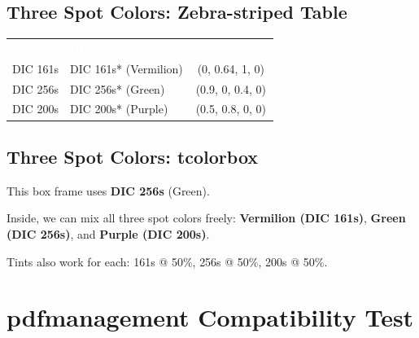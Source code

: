 \documentclass{article}\listfiles\pagestyle{empty}
\newcommand\onelineskip{\par\vspace{\baselineskip}\par}
\begin{document}
\onelineskip

\subsection*{Three Spot Colors: Zebra-striped Table}

\begin{center}
  \renewcommand{\arraystretch}{1.5}
  \begin{tabular}{p{3cm} p{5cm} c}
    \rowcolor{DIC200s}
    \textcolor{white}{\textbf{Color}} & \textcolor{white}{\textbf{PDF Name}} & \textcolor{white}{\textbf{Base CMYK}} \\
    \textcolor{DIC161s}{DIC 161s}  & DIC 161s* (Vermilion) & (0, 0.64, 1, 0) \\
    \textcolor{DIC256s}{DIC 256s}  & DIC 256s* (Green)     & (0.9, 0, 0.4, 0) \\
    \textcolor{DIC200s}{DIC 200s}  & DIC 200s* (Purple)    & (0.5, 0.8, 0, 0) \\
  \end{tabular}
\end{center}

\onelineskip

\subsection*{Three Spot Colors: tcolorbox}

\begin{tcolorbox}[
  enhanced,
  colframe=DIC256s,
  colback=DIC256s!5,
  coltitle=white,
  colbacktitle=DIC256s!80,
  fonttitle=\sffamily\bfseries\Large,
  title={Three-Color Harmony},
  drop fuzzy shadow=DIC256s!30
]
This box frame uses \textcolor{DIC256s}{\textbf{DIC 256s}} (Green).

Inside, we can mix all three spot colors freely:
\textcolor{DIC161s}{\textbf{Vermilion (DIC 161s)}},
\textcolor{DIC256s}{\textbf{Green (DIC 256s)}}, and
\textcolor{DIC200s}{\textbf{Purple (DIC 200s)}}.

\onelineskip

Tints also work for each:
\textcolor{DIC161s!50}{161s @ 50\%},
\textcolor{DIC256s!50}{256s @ 50\%},
\textcolor{DIC200s!50}{200s @ 50\%}.
\end{tcolorbox}

\clearpage

\section{pdfmanagement Compatibility Test}
%
\end{document}
